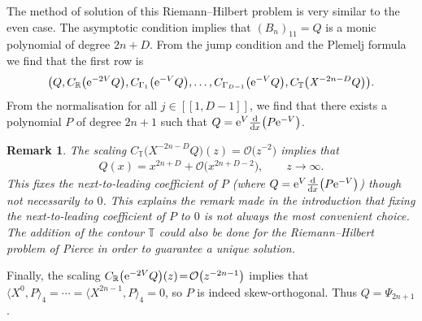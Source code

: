 \documentclass[pdftex]{sigma}
\numberwithin{equation}{section}
\newtheorem{Remark}[Theorem]{Remark}
\begin{document}
The method of solution of this Riemann--Hilbert problem is very similar to the even case. The asymptotic condition implies that $(B_{n})_{11} = Q$ is a monic polynomial of degree $2n+D$. From the jump condition and the Plemelj formula we find that the first row is
\begin{equation*}
\big( Q , C_{\mathbb{R}}\big({\rm e}^{-2V} Q\big) , C_{\Gamma_1}\big({\rm e}^{-V} Q\big) , \dots , C_{\Gamma_{D-1}}\big({\rm e}^{-V} Q\big) , C_{\mathbb{T}}\big( \mathit{X}^{-2n-D} Q\big)
\big).
\end{equation*}
From the normalisation  for all $j \in [\![1, D-1 ]\!]$, we find that there exists a polynomial $P$ of degree $2n+1$ such that $Q = {\rm e}^V \frac{\rm d}{{\rm d}x}\big( P {\rm e}^{-V}\big)$.
\begin{Remark} The scaling $C_{\mathbb{T}}\big( \mathit{X}^{-2n-D} Q\big)(z) = \mathcal{O}\big(z^{-2}\big)$ implies that
\begin{align*}
Q(x) = x^{2n+D} + \mathcal{O}\big(x^{2n+D-2}\big),\qquad z \to \infty .
\end{align*}
This fixes the next-to-leading coefficient of $P$ \big(where $Q = {\rm e}^V \frac{\rm d}{{\rm d}x}\big( P {\rm e}^{-V} \big)$\big) though not necessarily to $0$. This explains the remark made in the introduction that fixing the next-to-leading coefficient of $P$ to $0$ is not always the most convenient choice. The addition of the contour $\mathbb{T}$ could also be done for the Riemann--Hilbert problem of Pierce \cite{PIERCE2008230} in order to guarantee a unique solution.
\end{Remark}

Finally, the scaling $C_{\mathbb{R}}\big({\rm e}^{-2V} Q\big)(z) \!=\! \mathcal{O}\big(z^{-2n-1}\big)$ implies that ${\big\langle \mathit{X}^{0}, P \big\rangle_4\! = \!\cdots\! = \! \big\langle \mathit{X}^{2n-1}, P \big\rangle_4\! =\! 0}$, so $P$ is indeed skew-orthogonal. Thus $Q = \Psi_{2n+1}$.
\end{document}
